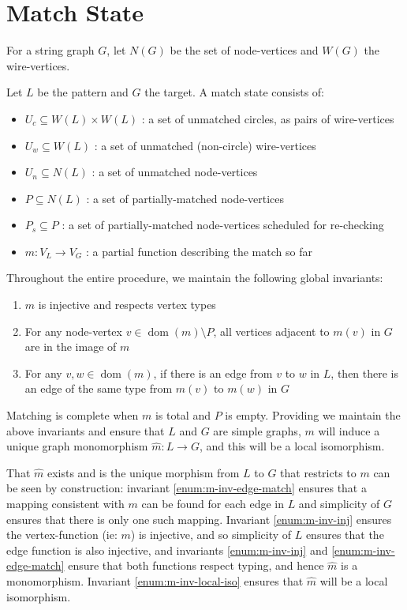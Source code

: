 \documentclass{article}
\DeclareMathOperator{\dom}{dom}
\begin{document}
\section{Match State}
\label{sec:match-state}

For a string graph $G$, let $N(G)$ be the set of node-vertices and $W(G)$ the wire-vertices.

Let $L$ be the pattern and $G$ the target. A match state consists of:

\begin{itemize}
    \item $U_c \subseteq W(L)\times W(L)$ : a set of unmatched circles, as pairs of wire-vertices
    \item $U_w \subseteq W(L)$ : a set of unmatched (non-circle) wire-vertices
    \item $U_n \subseteq N(L)$ : a set of unmatched node-vertices
    \item $P \subseteq N(L)$ : a set of partially-matched node-vertices
    \item $P_s \subseteq P$ : a set of partially-matched node-vertices scheduled for re-checking
    \item $m : V_L \rightarrow V_G$ : a partial function describing the match so far
\end{itemize}

Throughout the entire procedure, we maintain the following global invariants:
\begin{enumerate}
  \renewcommand{\theenumi}{(\arabic{enumi})}
  \renewcommand{\labelenumi}{\theenumi}
  \item \label{enum:m-inv-inj} $m$ is injective and respects vertex types
  \item \label{enum:m-inv-local-iso} For any node-vertex $v \in \dom(m)\setminus P$, all vertices adjacent to $m(v)$ in $G$ are in the image of $m$
  \item \label{enum:m-inv-edge-match} For any $v,w \in \dom(m)$, if there is an edge from $v$ to $w$ in $L$, then there is an edge of the same type from $m(v)$ to $m(w)$ in $G$
\end{enumerate}

Matching is complete when $m$ is total and $P$ is empty.  Providing we maintain the above invariants and ensure that $L$ and $G$ are simple graphs, $m$ will induce a unique graph monomorphism $\hat m:L \rightarrow G$, and this will be a local isomorphism.

That $\hat m$ exists and is the unique morphism from $L$ to $G$ that restricts to $m$ can be seen by construction: invariant \ref{enum:m-inv-edge-match} ensures that a mapping consistent with $m$ can be found for each edge in $L$ and simplicity of $G$ ensures that there is only one such mapping.  Invariant \ref{enum:m-inv-inj} ensures the vertex-function (ie: $m$) is injective, and so simplicity of $L$ ensures that the edge function is also injective, and invariants \ref{enum:m-inv-inj} and \ref{enum:m-inv-edge-match} ensure that both functions respect typing, and hence $\hat m$ is a monomorphism.  Invariant \ref{enum:m-inv-local-iso} ensures that $\hat m$ will be a local isomorphism.
\end{document}
